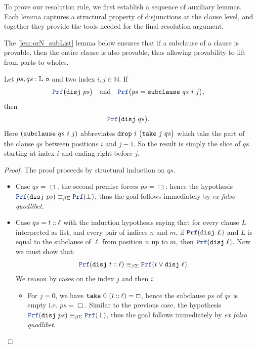 To prove our resolution rule, we first establish a sequence of auxiliary lemmas.
Each lemma captures a structural property of disjunctions at the clause level,
and together they provide the tools needed for the final resolution argument.

The \cref{lem:orN_subList} lemma below ensures that if a subclause of a clause is provable, then the entire clause is also provable, thus allowing provability to lift from parts to wholes.

\begin{lemma}\label{lem:orN_subList}
Let $ps, qs : \mathbb{L}~\texttt{o}$ and two index $i,j \in \mathbb{N}$. If
\[
\prf \bigl(\kw{disj}~ps\bigr)
\quad\text{and}\quad
\prf\bigl(ps = \kw{subclause}~qs~i~j\bigr),
\]
then
\[
\prf\bigl(\kw{disj}~qs\bigr).
\]
Here $(\texttt{\upshape{subclause}}~qs~i~j)$ abbreviates $\texttt{\upshape{drop}}~i~\bigl(\texttt{\upshape{take}}~j~qs\bigr)$ which take the part of the clause $qs$ between positions $i$ and $j-1$.
So the result is simply the slice of $qs$ starting at index  $i$ and ending right before $j$.
\begin{proof}
The proof proceeds by structural induction on $qs$.
\begin{itemize}
  \item[] Case $qs=\Box$, the second premise forces $ps=\Box$; hence the hypothesis $\prf(\kw{disj}~ps) \equivL \prf(\bot)$, thus the goal follows immediately by \emph{ex falso quodlibet}.
  \item[] Case $qs=t \mathbin{::} \ell$ with the induction hypothesis saying that for every clause $L$ interpreted as list, and every pair of indices $n$ and $m$, if $\prf(\kw{disj}~L)$ and $L$ is equal to the subclause of $\ell$ from position $n$ up to $m$, then $\prf(\kw{disj}~\ell)$.
    Now we must show that:
    \[
        \prf (\kw{disj}~t \cons \ell) \equivL \prf (t \lor \kw{disj}~\ell).
    \]
    We reason by cases on the index $j$ and then $i$.
    \begin{itemize}
      \item For $j=0$, we have $\texttt{\upshape{take}}~0~(t \mathbin{::} \ell)=\Box$, hence the subclause $ps$ of $qs$ is empty i.e. $ps = \Box$.
      Similar to the previous case, the hypothesis $\prf(\kw{disj}~ps) \equivL \prf(\bot)$, thus the goal follows immediately by \emph{ex falso quodlibet}.


\end{itemize}
\end{itemize}
\end{proof}
\end{lemma}
